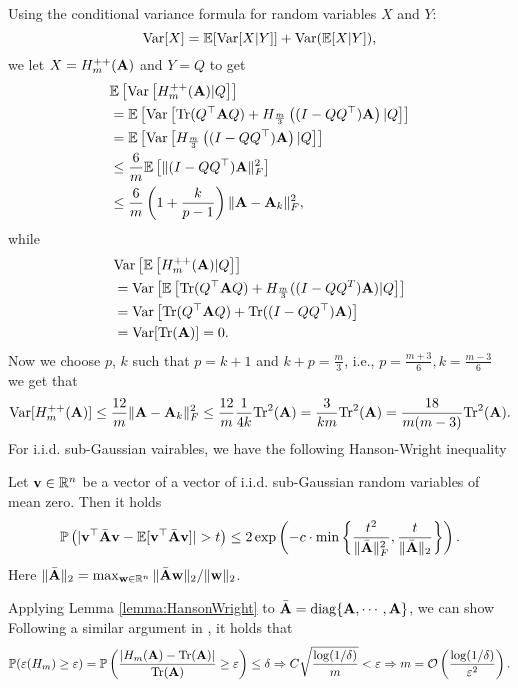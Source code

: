 Using the conditional variance formula for random variables $X$ and $Y$:
\[
\mathrm{Var}[X] = \mathbb{E}[\mathrm{Var}[X|Y]] + \mathrm{Var}(\mathbb{E}[X|Y]),
\]
we let $X = H_m^{++}({\bf A})$ and $Y = Q$ to get
\begin{align}
    &\mathbb{E}\left[ \mathrm{Var}\left[ H_m^{++}({\bf A})|Q \right] \right]\\
    &=\mathbb{E}\left[ \mathrm{Var}\left[ \mathrm{Tr}(Q^\top {\bf A} Q)+H_{\frac{m}{3}}\left( (I-QQ^\top){\bf A} \right)|Q \right] \right]\\
    &=\mathbb{E}\left[ \mathrm{Var}\left[ H_{\frac{m}{3}}\left( (I-QQ^\top){\bf A}\right)|Q \right]\right]\\
    &\le \frac{6}{m}\mathbb{E}\left[ \|(I-QQ^\top){\bf A}\|_{F}^2 \right]\\
    &\le \frac{6}{m}\left( 1+\frac{k}{p-1} \right)\|{\bf A}-{\bf A}_{k}\|_{F}^2,
\end{align}
while
\begin{align}
    &\mathrm{Var}\left[ \mathbb{E}\left[ H_m^{++}({\bf A})|Q \right] \right]\\
    &=\mathrm{Var}\left[ \mathbb{E}\left[ \mathrm{Tr}(Q^\top {\bf A} Q)+H_{\frac{m}{3}}( (I-QQ^T){\bf A})|Q \right] \right]\\
    &=\mathrm{Var}\left[ \mathrm{Tr}(Q^\top {\bf A} Q)+\mathrm{Tr}( (I-QQ^\top){\bf A}) \right]\\
    &=\mathrm{Var}[\mathrm{Tr}({\bf A})]=0.
\end{align}
Now we choose $p$, $k$ such that $p=k+1$ and $k+p=\frac{m}{3}$, i.e., $p=\frac{m+3}{6}, k=\frac{m-3}{6}$ we get that 
$$\mathrm{Var}[H_m^{++}({\bf A})]\le \frac{12}{m}\|{\bf A}-{\bf A}_k\|_F^2\le \frac{12}{m}\frac{1}{4k}\mathrm{Tr}^2({\bf A})=\frac{3}{km}\mathrm{Tr}^2({\bf A})=\frac{18}{m(m-3)}\mathrm{Tr}^2({\bf A}).$$
For i.i.d. sub-Gaussian vairables, we have the following Hanson-Wright inequality
\begin{lemma} Let $\mathbf{v}\in\mathbb{R}^n$ be a vector of a vector of i.i.d. sub-Gaussian random variables of mean zero. Then it holds
  $$\PP\left( |\mathbf{v}^\top \bar\bA\mathbf{v}-\mathbb{E}[\mathbf{v}^\top \bar\bA\mathbf{v}]|>t \right)\le 2\exp\left( -c \cdot \min \left\{ \frac{t^2}{\|\bar{\mathbf{A}}\|_F^2}, \frac{t}{\|\bar{\bA}\|_2} \right\} \right).$$
  \label{lemma:HansonWright}
  Here $\|\bar{{\bf A}}\|_2=\max_{\mathbf{w}\in\mathbb{R}^n}\|\bar{{\bf A}}\mathbf{w}\|_2/\|\mathbf{w}\|_2$. 
\end{lemma}
Applying Lemma \ref{lemma:HansonWright} to $\bar{{\bf A}}=\mathrm{diag}\{{\bf A}, \cdots, {\bf A}\}$, we can show
Following a similar argument in \cite{hutch_pp}, it holds that 
\begin{equation}
\begin{aligned}
  \mathbb P(\varepsilon(H_m)\ge \varepsilon)= \mathbb P\left( \frac{|H_m({\bf A})-\mathrm{Tr}({\bf A})|}{\mathrm{Tr}({\bf A})}\ge \varepsilon \right)\le\delta\Rightarrow C\sqrt{\frac{\log(1/\delta)}{m}}<\varepsilon\Rightarrow m=\mathcal{O}\left(\frac{\log(1/\delta)}{\varepsilon^2}  \right).
\end{aligned}
\label{}
\end{equation}
